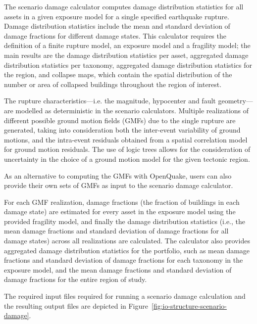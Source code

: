 The scenario damage calculator computes damage distribution statistics for all
assets in a given exposure model for a single specified earthquake rupture.
Damage distribution statistics include the mean and standard deviation of
damage fractions for different damage states. This calculator requires the
definition of a finite rupture model, an exposure model and a fragility model;
the main results are the damage distribution statistics per asset, aggregated
damage distribution statistics per taxonomy, aggregated damage distribution
statistics for the region, and collapse maps, which contain the spatial
distribution of the number or area of collapsed buildings throughout the
region of interest.

The rupture characteristics---i.e. the magnitude, hypocenter and fault
geometry---are modelled as deterministic in the scenario calculators. Multiple
realizations of different possible ground motion fields (GMFs) due to the
single rupture are generated, taking into consideration both the inter-event
variability of ground motions, and the intra-event residuals obtained from a
spatial correlation model for ground motion residuals. The use of logic trees
allows for the consideration of uncertainty in the choice of a ground motion
model for the given tectonic region.

As an alternative to computing the GMFs with OpenQuake, users can also provide
their own sets of GMFs as input to the scenario damage calculator.

For each GMF realization, damage fractions (the fraction of buildings in each
damage state) are estimated for every asset in the exposure model using the
provided fragility model, and finally the damage distribution statistics
(i.e., the mean damage fractions and standard deviation of damage fractions
for all damage states) across all realizations are calculated. The calculator
also provides aggregated damage distribution statistics for the portfolio,
such as mean damage fractions and standard deviation of damage fractions for
each taxonomy in the exposure model, and the mean damage fractions and
standard deviation of damage fractions for the entire region of study.

The required input files required for running a scenario damage calculation
and the resulting output files are depicted in Figure~\ref{fig:io-structure-scenario-damage}.

